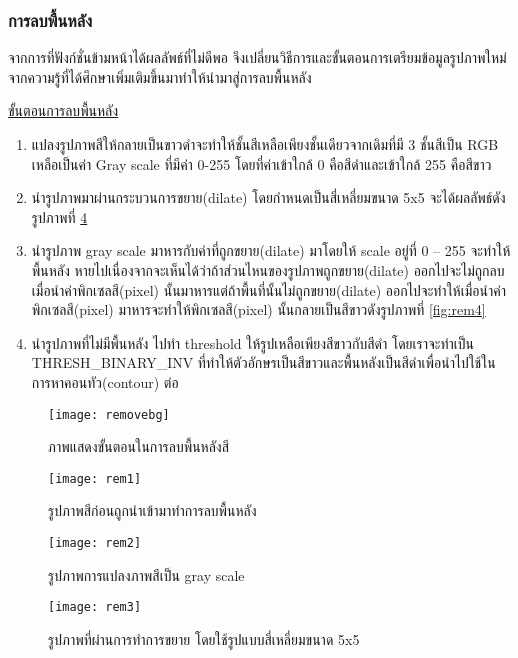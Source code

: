 \subsubsection{การลบพื้นหลัง}

จากการที่ฟังก์ชั่นข้ามหน้าได้ผลลัพธ์ที่ไม่ดีพอ จึงเปลี่ยนวิธีการและขั้นตอนการเตรียมข้อมูลรูปภาพใหม่จากความรู้ที่ได้ศึกษาเพิ่มเติมขึ้นมาทำให้นำมาสู่การลบพื้นหลัง

\underline{ขั้นตอนการลบพื้นหลัง}

\begin{enumerate}
    \item แปลงรูปภาพสีให้กลายเป็นขาวดำจะทำให้ชั้นสีเหลือเพียงชั้นเดียวจากเดิมที่มี 3 ชั้นสีเป็น RGB เหลือเป็นค่า Gray scale ที่มีค่า 0-255 โดยที่ค่าเข้าใกล้ 0 คือสีดำและเข้าใกล้ 255 คือสีขาว
    \item นำรูปภาพมาผ่านกระบวนการขยาย(dilate) โดยกำหนดเป็นสี่เหลี่ยมขนาด 5x5 จะได้ผลลัพธ์ดังรูปภาพที่ \ref{fig:rem3}
    \item นำรูปภาพ gray scale มาหารกับค่าที่ถูกขยาย(dilate) มาโดยให้ scale อยู่ที่ 0 – 255 จะทำให้พื้นหลัง หายไปเนื่องจากจะเห็นได้ว่าถ้าส่วนไหนของรูปภาพถูกขยาย(dilate) ออกไปจะไม่ถูกลบเมื่อนำค่าพิกเซลสี(pixel) นั้นมาหารแต่ถ้าพื้นที่นั้นไม่ถูกขยาย(dilate) ออกไปจะทำให้เมื่อนำค่าพิกเซลสี(pixel) มาหารจะทำให้พิกเซลสี(pixel) นั้นกลายเป็นสีขาวดังรูปภาพที่ \ref{fig:rem4}
    \item นำรูปภาพที่ไม่มีพื้นหลัง ไปทำ threshold ให้รูปเหลือเพียงสีขาวกับสีดำ โดยเราจะทำเป็น THRESH\_BINARY\_INV ที่ทำให้ตัวอักษรเป็นสีขาวและพื้นหลังเป็นสีดำเพื่อนำไปใช้ในการหาคอนทัว(contour) ต่อ
    \end{enumerate}

\begin{figure}[H]
    \centering
    \texttt{[image: removebg]}
    \caption{ภาพแสดงขั้นตอนในการลบพื้นหลังสี}\label{fig:removebg}
\end{figure}

\begin{figure}[H]
    \centering
    \texttt{[image: rem1]}
    \caption{รูปภาพสีก่อนถูกนำเข้ามาทำการลบพื้นหลัง}\label{fig:rem1}
\end{figure}

\begin{figure}[H]
    \centering
    \texttt{[image: rem2]}
    \caption{รูปภาพการแปลงภาพสีเป็น gray scale}\label{fig:rem2}
\end{figure}

\begin{figure}[H]
    \centering
    \texttt{[image: rem3]}
    \caption{รูปภาพที่ผ่านการทำการขยาย โดยใช้รูปแบบสี่เหลี่ยมขนาด 5x5}\label{fig:rem3}
\end{figure}

